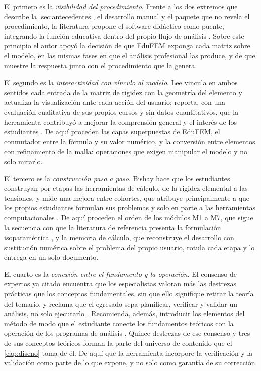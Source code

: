 El primero es la \emph{visibilidad del procedimiento}. Frente a los dos extremos que describe la \autoref{sec:antecedentes}, el desarrollo manual y el paquete que no revela el procedimiento, la literatura propone el software didáctico como puente, integrando la función educativa dentro del propio flujo de análisis \autocites[p.~157]{lee2015interactive}[p.~872]{lee2015eigenmodes}[p.~1008]{bishay2020teaching}. Sobre este principio el autor apoyó la decisión de que EduFEM exponga cada matriz sobre el modelo, en las mismas fases en que el análisis profesional las produce, y de que muestre la respuesta junto con el procedimiento que la genera.

El segundo es la \emph{interactividad con vínculo al modelo}. Lee vincula en ambos sentidos cada entrada de la matriz de rigidez con la geometría del elemento y actualiza la visualización ante cada acción del usuario; reporta, con una evaluación cualitativa de sus propios cursos y sin datos cuantitativos, que la herramienta contribuyó a mejorar la comprensión general y el interés de los estudiantes \autocites[pp.~158, 163, 166, 168]{lee2015interactive}[p.~874]{lee2015eigenmodes}. De aquí proceden las capas superpuestas de EduFEM, el conmutador entre la fórmula y su valor numérico, y la conversión entre elementos con refinamiento de la malla: operaciones que exigen manipular el modelo y no solo mirarlo.

El tercero es la \emph{construcción paso a paso}. Bishay hace que los estudiantes construyan por etapas las herramientas de cálculo, de la rigidez elemental a las tensiones, y mide una mejora entre cohortes, que atribuye principalmente a que los propios estudiantes formulan sus problemas y solo en parte a las herramientas computacionales \autocite[pp.~1010-1011, 1019, 1023]{bishay2020teaching}. De aquí proceden el orden de los módulos M1 a M7, que sigue la secuencia con que la literatura de referencia presenta la formulación isoparamétrica \autocites[pp.~339-347]{bathe2014fem}{cook2002concepts}, y la memoria de cálculo, que reconstruye el desarrollo con sustitución numérica sobre el problema del propio usuario, rotula cada etapa y lo entrega en un solo documento.

El cuarto es la \emph{conexión entre el fundamento y la operación}. El consenso de expertos ya citado encuentra que los especialistas valoran más las destrezas prácticas que los conceptos fundamentales, sin que ello signifique retirar la teoría del temario, y reclama que el egresado sepa planificar, verificar y validar un análisis, no solo ejecutarlo \autocite[pp.~1159, 1171]{perezsantiago2023fem}. Recomienda, además, introducir los elementos del método de modo que el estudiante conecte los fundamentos teóricos con la operación de los programas de análisis \autocite[p.~1168]{perezsantiago2023fem}. Quince destrezas de ese consenso y tres de sus conceptos teóricos \autocite[pp.~1162-1163]{perezsantiago2023fem} forman la parte del universo de contenido que el \autoref{cap:diseno} toma de él. De aquí que la herramienta incorpore la verificación y la validación como parte de lo que expone, y no solo como garantía de su corrección.

